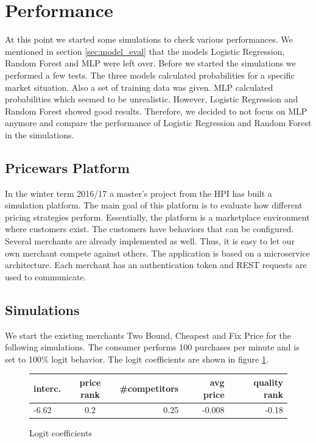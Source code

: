 \section{Performance}
\label{sec:performance}
    At this point we started some simulations to check various performances. We mentioned in section \ref{sec:model_eval} that the models Logistic Regression, Random Forest and MLP were left over. Before we started the simulations we performed a few tests. The three models calculated probabilities for a specific market situation. Also a set of training data was given. MLP calculated probabilities which seemed to be unrealistic. However, Logistic Regression and Random Forest showed good results. Therefore, we decided to not focus on MLP anymore and compare the performance of Logistic Regression and Random Forest in the simulations.

\subsection{Pricewars Platform}
\label{sec:platform}
    In the winter term 2016/17 a master's project from the HPI has built a simulation platform. The main goal of this platform is to evaluate how different pricing strategies perform. Essentially, the platform is a marketplace environment where customers exist. The customers have behaviors that can be configured. Several merchants are already implemented as well. Thus, it is easy to let our own merchant compete against others. The application is based on a microservice architecture. Each merchant has an authentication token and REST requests are used to communicate.

\subsection{Simulations}
    We start the existing merchants Two Bound, Cheapest and Fix Price for the following simulations. The consumer performs 100 purchases per minute and is set to 100\% logit behavior. The logit coefficients are shown in figure \ref{fig1}.
    \begin{figure}[ht]
    \centering
        \begin{tabular}{ l | c | r | r | r}
            interc. & price rank & \#competitors & avg price & quality rank \\
            \hline  
            -6.62 & 0.2 & 0.25 & -0.008 & -0.18 \\
        \end{tabular}
    \caption{Logit coefficients}
    \label{fig1}
    \end{figure}

